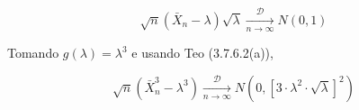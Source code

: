 \begin{equation}
\sqrt{n} \left( \bar{X}_n - \lambda \right) \sqrt{\lambda} \xrightarrow[n \to \infty]{\mathcal{D}} N(0,1)
\end{equation}

Tomando $g(\lambda) = \lambda^3$ e usando Teo (3.7.6.2(a)),

\begin{equation}
\sqrt{n} \left( \bar{X}_n^3 - \lambda^3 \right) \xrightarrow[n \to \infty]{\mathcal{D}} N\left(0, \left[ 3 \cdot \lambda^2 \cdot \sqrt{\lambda} \right]^2 \right)
\end{equation}